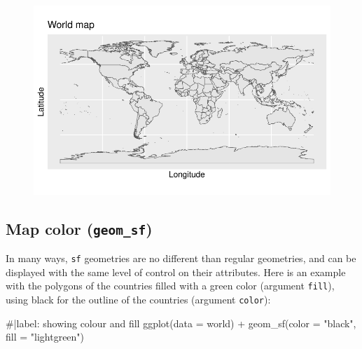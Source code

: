 \documentclass[
  letterpaper,
  DIV=11,
  numbers=noendperiod]{scrartcl}
\newenvironment{Shaded}{\begin{snugshade}}{\end{snugshade}}
\newcommand{\AttributeTok}[1]{\textcolor[rgb]{0.40,0.45,0.13}{#1}}
\newcommand{\CommentTok}[1]{\textcolor[rgb]{0.37,0.37,0.37}{#1}}
\newcommand{\FunctionTok}[1]{\textcolor[rgb]{0.28,0.35,0.67}{#1}}
\newcommand{\NormalTok}[1]{\textcolor[rgb]{0.00,0.23,0.31}{#1}}
\newcommand{\SpecialCharTok}[1]{\textcolor[rgb]{0.37,0.37,0.37}{#1}}
\newcommand{\StringTok}[1]{\textcolor[rgb]{0.13,0.47,0.30}{#1}}
\begin{document}
\begin{figure}[H]

{\centering \includegraphics{Introduction-to-mapping_files/figure-pdf/unnamed-chunk-7-1.pdf}

}

\end{figure}

\hypertarget{map-color-geom_sf}{%
\subsection{\texorpdfstring{Map color
(\texttt{geom\_sf})}{Map color (geom\_sf)}}\label{map-color-geom_sf}}

In many ways, \texttt{sf} geometries are no different than regular
geometries, and can be displayed with the same level of control on their
attributes. Here is an example with the polygons of the countries filled
with a green color (argument \texttt{fill}), using black for the outline
of the countries (argument \texttt{color}):

\begin{Shaded}
\begin{Highlighting}[]
\CommentTok{\#|label: showing colour and fill}
\FunctionTok{ggplot}\NormalTok{(}\AttributeTok{data =}\NormalTok{ world) }\SpecialCharTok{+}      
  \FunctionTok{geom\_sf}\NormalTok{(}\AttributeTok{color =} \StringTok{"black"}\NormalTok{, }\AttributeTok{fill =} \StringTok{"lightgreen"}\NormalTok{)}
\end{Highlighting}
\end{Shaded}
\end{document}
